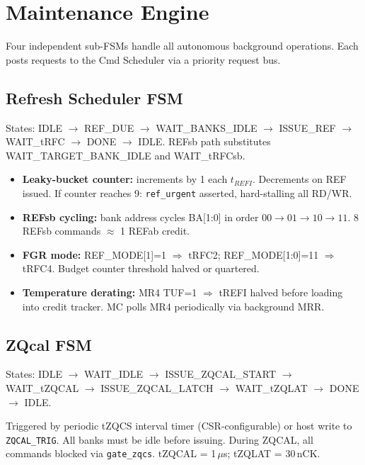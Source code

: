 \documentclass[10pt,a4paper]{article}
\begin{document}
\section{Maintenance Engine}

Four independent sub-FSMs handle all autonomous background operations. Each posts requests
to the Cmd Scheduler via a priority request bus.

\subsection{Refresh Scheduler FSM}

States: IDLE $\to$ REF\_DUE $\to$ WAIT\_BANKS\_IDLE $\to$ ISSUE\_REF $\to$ WAIT\_tRFC
$\to$ DONE $\to$ IDLE. REFsb path substitutes WAIT\_TARGET\_BANK\_IDLE and WAIT\_tRFCsb.

\begin{itemize}
  \item \textbf{Leaky-bucket counter:} increments by 1 each $t_{REFI}$. Decrements on REF issued.
        If counter reaches 9: \texttt{ref\_urgent} asserted, hard-stalling all RD/WR.
  \item \textbf{REFsb cycling:} bank address cycles BA[1:0] in order $00 \to 01 \to 10 \to 11$.
        8 REFsb commands $\approx$ 1 REFab credit.
  \item \textbf{FGR mode:} REF\_MODE[1]=1 $\Rightarrow$ tRFC2; REF\_MODE[1:0]=11 $\Rightarrow$ tRFC4.
        Budget counter threshold halved or quartered.
  \item \textbf{Temperature derating:} MR4 TUF=1 $\Rightarrow$ tREFI halved before loading into
        credit tracker. MC polls MR4 periodically via background MRR.
\end{itemize}

\subsection{ZQcal FSM}

States: IDLE $\to$ WAIT\_IDLE $\to$ ISSUE\_ZQCAL\_START $\to$ WAIT\_tZQCAL $\to$
ISSUE\_ZQCAL\_LATCH $\to$ WAIT\_tZQLAT $\to$ DONE $\to$ IDLE.

Triggered by periodic tZQCS interval timer (CSR-configurable) or host write to
\texttt{ZQCAL\_TRIG}. All banks must be idle before issuing. During ZQCAL, all commands
blocked via \texttt{gate\_zqcs}. tZQCAL = 1\,$\mu$s; tZQLAT = 30\,nCK.
\end{document}
